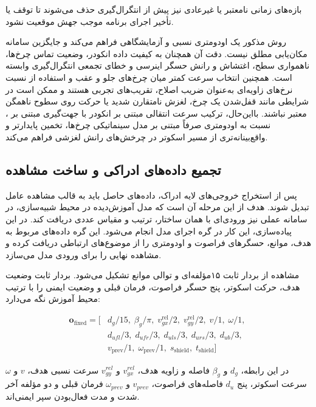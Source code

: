بازه‌های زمانی نامعتبر یا غیرعادی نیز پیش از انتگرال‌گیری حذف می‌شوند تا توقف یا تأخیر اجرای برنامه موجب جهش موقعیت نشود.

روش مذکور یک اودومتری نسبی و آزمایشگاهی فراهم می‌کند و جایگزین سامانه مکان‌یابی مطلق نیست. دقت آن همچنان به کیفیت داده انکودر، وضعیت تماس چرخ‌ها، ناهمواری سطح، اغتشاش و رانش حسگر اینرسی و خطای تجمعی انتگرال‌گیری وابسته است. همچنین انتخاب سرعت کمتر میان چرخ‌های جلو و عقب و استفاده از نسبت نرخ‌های زاویه‌ای به‌عنوان ضریب اصلاح، تقریب‌های تجربی هستند و ممکن است در شرایطی مانند قفل‌شدن یک چرخ، لغزش نامتقارن شدید یا حرکت روی سطوح ناهمگن معتبر نباشند. بااین‌حال، ترکیب سرعت انتقالی مبتنی بر انکودر با جهت‌گیری مبتنی بر ، نسبت به اودومتری صرفاً مبتنی بر مدل سینماتیکی چرخ‌ها، تخمین پایدارتر و واقع‌بینانه‌تری از مسیر اسکوتر در چرخش‌های رانش لغزشی فراهم می‌کند.

\subsection{تجمیع داده‌های ادراکی و ساخت مشاهده}
\label{subsec:real_observation_construction}

پس از استخراج خروجی‌های لایه ادراک، داده‌های حاصل باید به قالب مشاهده عامل تبدیل شوند. هدف از این مرحله آن است که مدل آموزش‌دیده در محیط شبیه‌سازی، در سامانه عملی نیز ورودی‌ای با همان ساختار، ترتیب و مقیاس عددی دریافت کند. در این پیاده‌سازی، این کار در گره اجرای مدل انجام می‌شود. این گره داده‌های مربوط به هدف، موانع، حسگرهای فراصوت و اودومتری را از موضوع‌های ارتباطی  دریافت کرده و مشاهده نهایی را برای ورودی مدل  می‌سازد.

مشاهده از بردار ثابت ۱۵‌مؤلفه‌ای و توالی موانع تشکیل می‌شود. بردار ثابت وضعیت هدف، حرکت اسکوتر، پنج حسگر فراصوت، فرمان قبلی و وضعیت ایمنی را با ترتیب محیط آموزش نگه می‌دارد:

\begin{equation}
	\begin{aligned}
		\mathbf{o}_{\mathrm{fixed}} =
		[&
		d_g/15,\;
		\beta_g/\pi,\;
		v_{gx}^{\mathrm{rel}}/2,\;
		v_{gy}^{\mathrm{rel}}/2,\;
		v/1,\;
		\omega/1,\;\\
		&
		d_{ufl}/3,\;
		d_{ufr}/3,\;
		d_{uls}/3,\;
		d_{urs}/3,\;
		d_{ub}/3,\;\\
		&
		v_{\mathrm{prev}}/1,\;
		\omega_{\mathrm{prev}}/1,\;
		s_{\mathrm{shield}},\;
		t_{\mathrm{shield}}
		]
	\end{aligned}
	\label{eq:real_fixed_observation_vector}
\end{equation}

در این رابطه، $d_g$ و $\beta_g$ فاصله و زاویه هدف، $v_{gx}^{rel}$ و $v_{gy}^{rel}$ سرعت نسبی هدف، $v$ و $\omega$ سرعت اسکوتر، پنج $d_u$ فاصله‌های فراصوت، $v_{prev}$ و $\omega_{prev}$ فرمان قبلی و دو مؤلفه آخر شدت و مدت فعال‌بودن سپر ایمنی‌اند.

